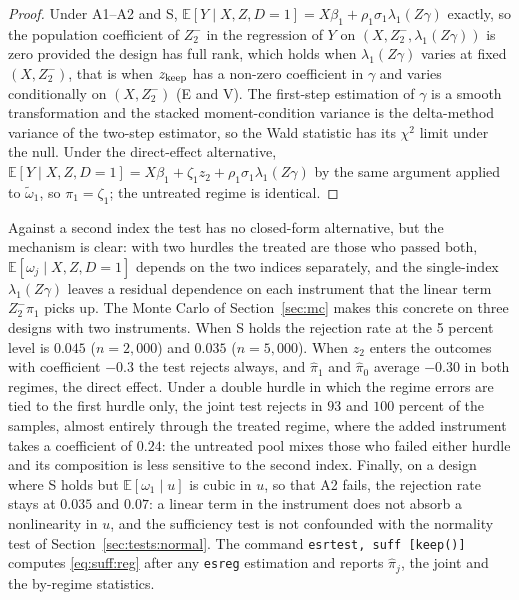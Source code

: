 \documentclass[11pt,a4paper]{article}
\theoremstyle{plain}
\theoremstyle{definition}
\theoremstyle{remark}
\newcommand{\E}{\mathbb{E}}
\newcommand{\1}{\mathbf{1}}
\newcommand{\cmd}[1]{\texttt{#1}}
\begin{document}
\begin{proof}
Under A1--A2 and S, $\E[Y\mid X,Z,D=1]=X\beta_1+\rho_1\sigma_1\lambda_1(Z\gamma)$
exactly, so the population coefficient of $Z_2^-$ in the regression of $Y$
on $(X,Z_2^-,\lambda_1(Z\gamma))$ is zero provided the design has full
rank, which holds when $\lambda_1(Z\gamma)$ varies at fixed
$(X,Z_2^-)$, that is when $z_{\rm keep}$ has a non-zero coefficient in
$\gamma$ and varies conditionally on $(X,Z_2^-)$ (E and V). The first-step
estimation of $\gamma$ is a smooth transformation and the stacked
moment-condition variance is the delta-method variance of the two-step
estimator, so the Wald statistic has its $\chi^2$ limit under the null.
Under the direct-effect alternative,
$\E[Y\mid X,Z,D=1]=X\beta_1+\zeta_1z_2+\rho_1\sigma_1\lambda_1(Z\gamma)$ by
the same argument applied to $\tilde\omega_1$, so $\pi_1=\zeta_1$; the
untreated regime is identical.
\end{proof}

Against a second index the test has no closed-form alternative, but the
mechanism is clear: with two hurdles the treated are those who passed both,
$\E[\omega_j\mid X,Z,D=1]$ depends on the two indices separately, and the
single-index $\lambda_1(Z\gamma)$ leaves a residual dependence on each
instrument that the linear term $Z_2^-\pi_1$ picks up. The Monte Carlo of
Section~\ref{sec:mc} makes this concrete on three designs with two
instruments. When S holds the rejection rate at the 5 percent level is
$0.045$ ($n=2{,}000$) and $0.035$ ($n=5{,}000$). When $z_2$ enters the
outcomes with coefficient $-0.3$ the test rejects always, and
$\hat\pi_1$ and $\hat\pi_0$ average $-0.30$ in both regimes, the direct
effect. Under a double hurdle in which the regime errors are tied to the
first hurdle only, the joint test rejects in $93$ and $100$ percent of
the samples, almost entirely through the treated regime, where the added
instrument takes a coefficient of $0.24$: the untreated pool mixes those
who failed either hurdle and its composition is less sensitive to the
second index. Finally, on a design where S holds but $\E[\omega_1\mid u]$
is cubic in $u$, so that A2 fails, the rejection rate stays at $0.035$ and
$0.07$: a linear term in the instrument does not absorb a nonlinearity in
$u$, and the sufficiency test is not confounded with the normality test of
Section~\ref{sec:tests:normal}. The command \cmd{esrtest, suff [keep()]}
computes \eqref{eq:suff:reg} after any \cmd{esreg} estimation and reports
$\hat\pi_j$, the joint and the by-regime statistics.
\end{document}
